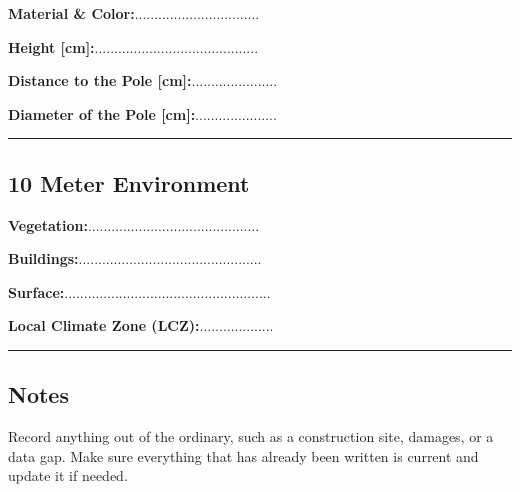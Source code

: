 \begin{multicols}{2}
\textbf{Material \& Color:}................................\hfill \newline

\textbf{Height [cm]:}..........................................\hfill \newline

\columnbreak
\textbf{Distance to the Pole [cm]:}......................\hfill \newline

\textbf{Diameter of the Pole [cm]:}.....................\hfill \newline

\end{multicols}

\vspace{-10mm}
\rule{\linewidth}{0.1mm}

\vspace{-5mm}
\subsection*{10 Meter Environment}

\begin{multicols}{2}
\textbf{Vegetation:}............................................\hfill \newline

\textbf{Buildings:}...............................................\hfill \newline
\columnbreak

\textbf{Surface:}.....................................................\hfill \newline

\textbf{Local Climate Zone (LCZ):}...................\hfill
\end{multicols}
\vspace{-10mm}
\rule{\linewidth}{0.1mm}

\vspace{-5mm}
\subsection*{Notes}
Record anything out of the ordinary, such as a construction site, damages, or a data gap. Make sure everything that has already been written is current and update it if needed.\newline

